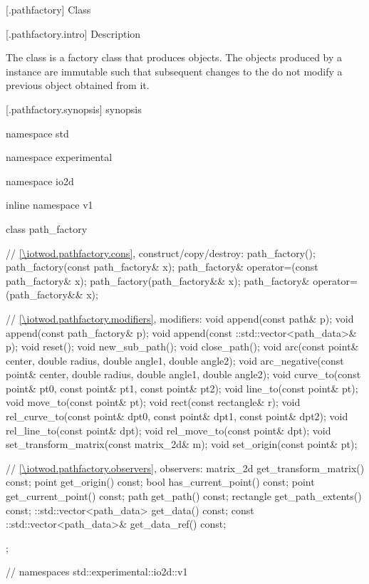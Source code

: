  [\iotwod.pathfactory] {Class }

 [\iotwod.pathfactory.intro] { Description}

\pnum
{}%
The  class is a factory class that produces  
objects. The  objects produced by a  instance 
are immutable such that subsequent changes to the  do not 
modify a previous  object obtained from it.

 [\iotwod.pathfactory.synopsis] { synopsis}

\begin{codeblock}
namespace std { namespace experimental { namespace io2d { inline namespace v1 {
  class path_factory {
    // \ref{\iotwod.pathfactory.cons}, construct/copy/destroy:
    path_factory();
    path_factory(const path_factory& x);
    path_factory& operator=(const path_factory& x);
    path_factory(path_factory&& x);
    path_factory& operator=(path_factory&& x);
    
    // \ref{\iotwod.pathfactory.modifiers}, modifiers:
    void append(const path& p);
    void append(const path_factory& p);
    void append(const ::std::vector<path_data>& p);
    void reset();
    void new_sub_path();
    void close_path();
    void arc(const point& center, double radius, double angle1,
    double angle2);
    void arc_negative(const point& center, double radius,
    double angle1, double angle2);
    void curve_to(const point& pt0, const point& pt1,
    const point& pt2);
    void line_to(const point& pt);
    void move_to(const point& pt);
    void rect(const rectangle& r);
    void rel_curve_to(const point& dpt0, const point& dpt1,
    const point& dpt2);
    void rel_line_to(const point& dpt);
    void rel_move_to(const point& dpt);
    void set_transform_matrix(const matrix_2d& m);
    void set_origin(const point& pt);
    
    // \ref{\iotwod.pathfactory.observers}, observers:
    matrix_2d get_transform_matrix() const;
    point get_origin() const;
    bool has_current_point() const;
    point get_current_point() const;
    path get_path() const;
    rectangle get_path_extents() const;
    ::std::vector<path_data> get_data() const;
    const ::std::vector<path_data>& get_data_ref() const;
  };
} } } } // namespaces std::experimental::io2d::v1
\end{codeblock}

